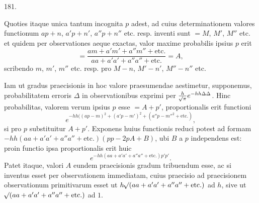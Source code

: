 \begin{center}\hypertarget{native-254-article181}{}181.\end{center}
Quoties itaque unica tantum incognita $p$ adest, ad cuius determinationem
valores functionum $ap+n$, $a'p+n'$, $a''p+n''$ etc. resp. inventi sunt $=M$,
$M'$, $M''$ etc. et quidem per observationes aeque exactas, valor maxime
probabilis ipsius $p$ erit
\[
=\frac{am+a'm'+a''m''+\text{etc.}}{aa+a'a'+a''a''+\text{etc.}}=A,
\]
scribendo $m$, $m'$, $m''$ etc. resp. pro $M-n$, $M'-n'$, $M''-n''$ etc.

Iam ut gradus praecisionis in hoc valore praesumendae aestimetur,
supponemus, probabilitatem erroris $\Delta$ in observationibus exprimi per
$\frac{h}{\mathord{{}^{}\!\surd}\pi}e^{-hh\Delta\Delta}$. Hinc probabilitas, valorem
verum ipsius $p$ esse $=A+p'$, proportionalis erit functioni
\[
e^{-hh((ap-m)^2+(a'p-m')^2+(a''p-m''^2+\text{etc.})},
\]
si pro $p$ substituitur $A+p'$. Exponens huius functionis reduci potest ad
formam $-hh(aa+a'a'+a''a''+\text{etc.})(pp-2pA+B)$, ubi $B$ a $p$
independens est: proin functio ipsa proportionalis erit huic
\[
e^{-hh(aa+a'a'+a''a''+\text{etc.})p'p'}.
\]
Patet itaque, valori $A$ eundem praecisionis gradum tribuendum esse, ac si
inventus esset per observationem immediatam, cuius praecisio ad
praecisionem observationum primitivarum esset ut
$h\mathord{{}^{}\!\surd}(aa+a'a'+a''a''+\text{etc.})$ ad $h$, sive ut
$\mathord{{}^{}\!\surd}(aa+a'a'+a''a''+\text{etc.})$ ad $1$.
